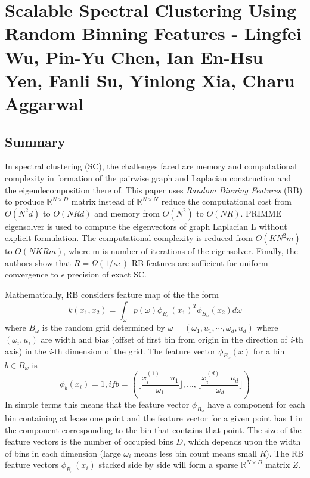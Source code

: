 \documentclass[10pt,a4paper,twoside]{report}
\theoremstyle{definition}
\begin{document}
	

	
	
	\chapter*{Scalable Spectral Clustering Using Random Binning Features - Lingfei Wu, Pin-Yu Chen, Ian En-Hsu Yen, Fanli Su, Yinlong Xia, Charu Aggarwal}
	\section*{Summary}
	In spectral clustering (SC), the challenges faced are memory and computational complexity in formation of the pairwise graph and Laplacian construction and the eigendecomposition there of. This paper uses \textit{Random Binning Features} (RB) to produce $\mathbb{R}^{N\times D}$ matrix instead of $\mathbb{R}^{N\times N}$ reduce the computational cost from $O(N^2d)$ to $O(NRd)$ and memory from $O(N^2)$ to $O(NR)$. PRIMME eigensolver is used to compute the eigenvectors of graph Laplacian L without explicit formulation. The computational complexity is reduced from $O(KN^2m)$ to $O(NKRm)$, where m is number of iterations of the eigensolver. Finally, the authors show that $R=\Omega(1/\kappa\epsilon)$ RB features are sufficient for uniform convergence to $\epsilon$ precision of exact SC.
	
	Mathematically, RB considers feature map of the the form $$k(x_1, x_2) = \int_{\omega} p(\omega) \phi_{B_\omega}(x_1)^T\phi_{B_\omega}(x_2)d\omega$$ where $B_\omega$ is the random grid determined by $\omega = (\omega_1,u_1,\cdots, \omega_d, u_d)$ where $(\omega_i,u_i)$ are width and bias (offset of first bin from origin in the direction of \textit{i}-{th} axis) in the \textit{i}-th dimension of the grid. The feature vector $\phi_{B_\omega}(x)$ for a bin $b \in B_\omega$ is $$\phi_{b}(x_i)=1, if b=(\lfloor\frac{x^{(1)}_i-u_1}{\omega_1}\rfloor,\dots, \lfloor\frac{x_i^{(d)}-u_d}{\omega_d}\rfloor)$$
	In simple terms this means that the feature vector $\phi_{B_\omega}$ have a component for each bin containing at lease one point and the feature vector for a given point has $1$ in the component corresponding to the bin that contains that point. The size of the feature vectors is the number of occupied bins $D$, which depends upon the width of bins in each dimension (large $\omega_i$ means less bin count means small $R$). The RB feature vectors $\phi_{B_\omega}(x_i)$ stacked side by side will form a sparse $\mathbb{R}^{N\times D}$ matrix $Z$.
	
\end{document}
